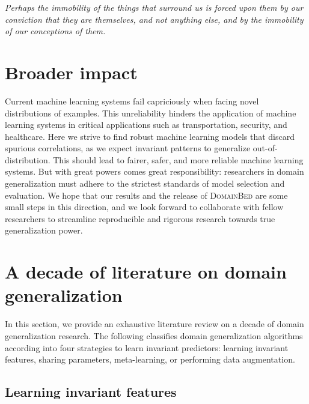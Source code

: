 \documentclass{article}
\newcommand{\domainbed}{\textsc{DomainBed}\xspace}
\begin{document}
\begin{center}
\textit{Perhaps the immobility of the things that surround us is forced upon them by our conviction that they are themselves, and not anything else, and by the immobility of our conceptions of them.}
\end{center}

\section*{Broader impact}

Current machine learning systems fail capriciously when facing novel distributions of examples.
This unreliability hinders the application of machine learning systems in critical applications such as transportation, security, and healthcare.
Here we strive to find robust machine learning models that discard spurious correlations, as we expect invariant patterns to generalize out-of-distribution. 
This should lead to fairer, safer, and more reliable machine learning systems.
But with great powers comes great responsibility: researchers in domain generalization must adhere to the strictest standards of model selection and evaluation.
We hope that our results and the release of \domainbed are some small steps in this direction, and we look forward to collaborate with fellow researchers to streamline reproducible and rigorous research towards true generalization power.




\clearpage
\newpage
\appendix

\section{A decade of literature on domain generalization}

In this section, we provide an exhaustive literature review on a decade of domain generalization research.
The following classifies domain generalization algorithms according into four strategies to learn invariant predictors: learning invariant features, sharing parameters, meta-learning, or performing data augmentation.

\subsection{Learning invariant features}
\end{document}
